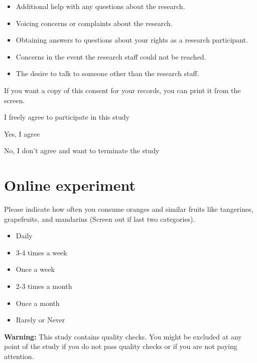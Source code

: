 \documentclass[12pt]{article}
\begin{document}
{\begin{itemize}
    \item Additional help with any questions about the research.
    \item Voicing concerns or complaints about the research.
    \item Obtaining answers to questions about your rights as a research participant.
    \item Concerns in the event the research staff could not be reached.
    \item The desire to talk to someone other than the research staff.
\end{itemize} \par



If you want a copy of this consent for your records, you can print it from the screen. \par

I freely agree to participate in this study \par
[Dropdown menu options:] \par
Yes, I agree \par

No, I don't agree and want to terminate the study

\section{Online experiment}

 Please indicate how often you consume oranges and similar fruits like tangerines, grapefruits, and mandarins (Screen out if last two categories).  

\begin{itemize}
    \item Daily
    \item 3-4 times a week
    \item Once a week
    \item 2-3 times a month
    \item Once a month
    \item Rarely or Never
\end{itemize}

\vspace{1cm} %

\textbf{Warning:} This study contains quality checks. You might be excluded at any point of the study if you do not pass quality checks or if you are not paying attention.


}
\end{document}
